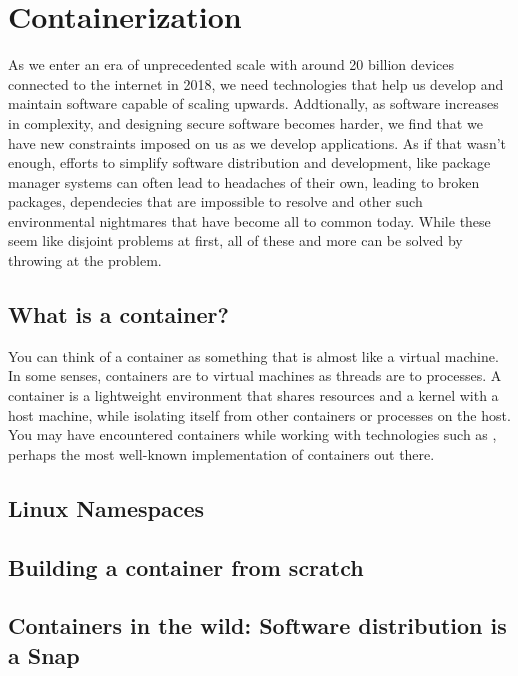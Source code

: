 \section{Containerization}
As we enter an era of unprecedented scale with around 20 billion devices
connected to the internet in 2018, we need technologies that help us develop and
maintain software capable of scaling upwards. Addtionally, as software increases
in complexity, and designing secure software becomes harder, we find that we
have new constraints imposed on us as we develop applications. As if that wasn't
enough, efforts to simplify software distribution and development, like package
manager systems can often lead to headaches of their own, leading to broken
packages, dependecies that are impossible to resolve and other such
environmental nightmares that have become all to common today. While these seem
like disjoint problems at first, all of these and more can be solved by throwing
 at the problem.

\subsection{What is a container?}
You can think of a container as something that is almost like a virtual machine.
In some senses, containers are to virtual machines as threads are to processes.
A container is a lightweight environment that shares resources and a kernel with
a host machine, while isolating itself from other containers or processes on the
host. You may have encountered containers while working with technologies such
as , perhaps the most well-known implementation of containers
out there.

\subsection{Linux Namespaces}

\subsection{Building a container from scratch}

\subsection{Containers in the wild: Software distribution is a Snap}
